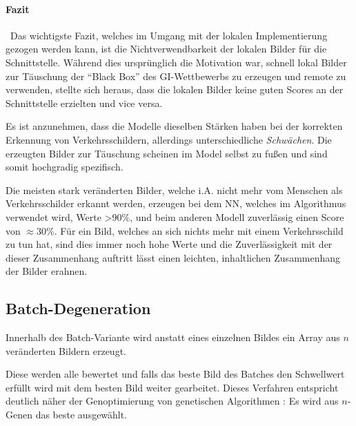 \paragraph{Fazit}~\newline Das wichtigste Fazit, welches im Umgang mit der lokalen Implementierung gezogen werden kann, ist die Nichtverwendbarkeit der lokalen Bilder für die Schnittstelle. Während dies ursprünglich die Motivation war, schnell lokal Bilder zur Täuschung der "`Black Box"' des \ac{GI}-Wettbewerbs zu erzeugen und remote zu verwenden, stellte sich heraus, dass die lokalen Bilder keine guten Scores an der Schnittstelle erzielten und vice versa. 

Es ist anzunehmen, dass die Modelle dieselben Stärken haben bei der korrekten Erkennung von Verkehrsschildern, allerdings unterschiedliche \textit{Schwächen}. Die erzeugten Bilder zur Täuschung scheinen im Model selbst zu fußen und sind somit hochgradig spezifisch. 

Die meisten stark veränderten Bilder, welche i.A. nicht mehr vom Menschen als Verkehrsschilder erkannt werden, erzeugen bei dem \ac{NN}, welches im Algorithmus verwendet wird, Werte >90\%, und beim anderen Modell zuverlässig einen Score von $\approx$30\%. Für ein Bild, welches an sich nichts mehr mit einem Verkehrsschild zu tun hat, sind dies immer noch hohe Werte und die Zuverlässigkeit mit der dieser Zusammenhang auftritt lässt einen leichten, inhaltlichen Zusammenhang der Bilder erahnen.

\newpage
\subsection{Batch-Degeneration}
Innerhalb des Batch-Variante wird anstatt eines einzelnen Bildes ein Array aus $n$ veränderten Bildern erzeugt. 

Diese werden alle bewertet und falls das beste Bild des Batches den Schwellwert erfüllt wird mit dem besten Bild weiter gearbeitet. Dieses Verfahren entspricht deutlich näher der Genoptimierung von genetischen Algorithmen \cite{gerdes2013evolutionare}: Es wird aus $n$-Genen das beste ausgewählt. 

